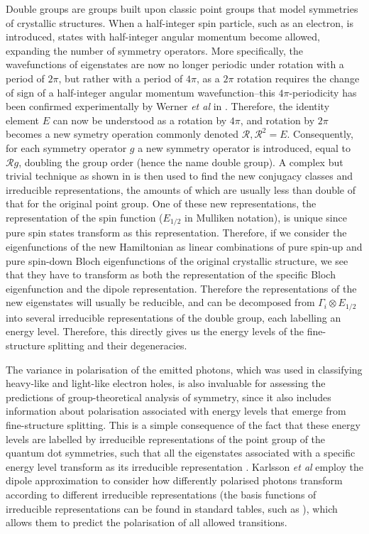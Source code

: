 \documentclass[12pt]{article}
\begin{document}
Double groups are groups built upon classic point groups that model symmetries of crystallic structures. When a half-integer spin particle, such as an electron, is introduced, states with half-integer angular momentum become allowed, expanding the number of symmetry operators. More specifically, the wavefunctions of eigenstates are now no longer periodic under rotation with a period of $2\pi$, but rather with a period of $4\pi$, as a $2\pi$ rotation requires the change of sign of a half-integer angular momentum wavefunction--this $4\pi$-periodicity has been confirmed experimentally by Werner \textit{et al} in \cite{fermion_periodicity}. Therefore, the identity element $E$ can now be understood as a rotation by $4\pi$, and rotation by $2\pi$ becomes a new symetry operation commonly denoted $\mathcal{R}, \mathcal{R}^2=E$. Consequently, for each symmetry operator $g$ a new symmetry operator is introduced, equal to $\mathcal{R}g$, doubling the group order (hence the name double group). A complex but trivial technique as shown in \cite{heine} is then used to find the new conjugacy classes and irreducible representations, the amounts of which are usually less than double of that for the original point group. One of these new representations, the representation of the spin function ($E_{1/2}$ in Mulliken notation), is unique since pure spin states transform as this representation. Therefore, if we consider the eigenfunctions of the new Hamiltonian as linear combinations of pure spin-up and pure spin-down Bloch eigenfunctions of the original crystallic structure, we see that they have to transform as both the representation of the specific Bloch eigenfunction and the dipole representation. Therefore the representations of the new eigenstates will usually be reducible, and can be decomposed from $\Gamma_i\otimes E_{1/2}$ into several irreducible representations of the double group, each labelling an energy level. Therefore, this directly gives us the energy levels of the fine-structure splitting and their degeneracies.

The variance in polarisation of the emitted photons, which was used in classifying heavy-like and light-like electron holes, is also invaluable for assessing the predictions of group-theoretical analysis of symmetry, since it also includes information about polarisation associated with energy levels that emerge from fine-structure splitting. This is a simple consequence of the fact that these energy levels are labelled by irreducible representations of the point group of the quantum dot symmetries, such that all the eigenstates associated with a specific energy level transform as its irreducible representation \cite[Ch. 5]{dresselhaus}. Karlsson \textit{et al} employ the dipole approximation to consider how differently polarised photons transform according to different irreducible representations (the basis functions of irreducible representations can be found in standard tables, such as \cite{altmann}), which allows them to predict the polarisation of all allowed transitions.
\end{document}
